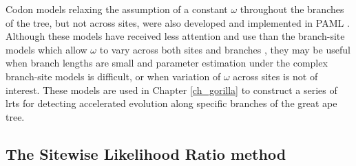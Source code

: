 Codon models relaxing the assumption of a constant $\omega$ throughout
the branches of the tree, but not across sites, were also developed
and implemented in PAML \citep{Yang1998,Yang1998a}. Although these
models have received less attention and use than the branch-site
models which allow $\omega$ to vary across both sites and branches
\citep{Zhang2005}, they may be useful when branch lengths are small
and parameter estimation under the complex branch-site models is
difficult, or when variation of $\omega$ across sites is not of
interest. These models are used in Chapter \ref{ch_gorilla} to
construct a series of \acp{lrt} for detecting accelerated evolution
along specific branches of the great ape tree.

\subsection{The Sitewise Likelihood Ratio method}

